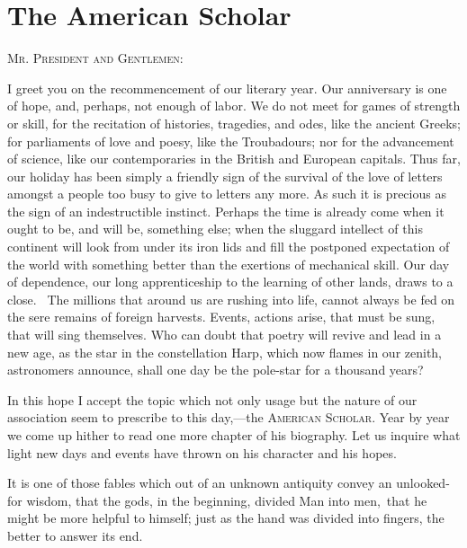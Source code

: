 
\author{Ralph Waldo Emerson}
\chapter{The American Scholar}


\begin{abstract}{c} An Oration delivered before the Phi Beta Kappa
Society, at Cambridge, August 31, 1837. \end{abstract}

\noindent\textsc{Mr. President and Gentlemen}:

I greet you on the recommencement of our literary year. Our
anniversary is one of hope, and, perhaps, not enough of labor. We do
not meet for games of strength or skill, for the recitation of
histories, tragedies, and odes, like the ancient Greeks; for
parliaments of love and poesy, like the Troubadours; nor for the
advancement of science, like our contemporaries in the British and
European capitals. Thus far, our holiday has been simply a friendly
sign of the survival of the love of letters amongst a people too busy
to give to letters any more. As such it is precious as the sign of an
indestructible instinct. Perhaps the time is already come when it
ought to be, and will be, something else; when the sluggard intellect
of this continent will look from under its iron lids and fill the
postponed expectation of the world with something better than the
exertions of mechanical skill. Our day of dependence, our long
apprenticeship to the learning of other lands, draws to a close. 
 The millions that around us are rushing into life, cannot
always be fed on the sere remains of foreign harvests. Events, actions
arise, that must be sung, that will sing themselves. Who can doubt
that poetry will revive and lead in a new age, as the star in the
constellation Harp, which now flames in our zenith, astronomers
announce, shall one day be the pole-star for a thousand years?

In this hope I accept the topic which not only usage but the nature of
our association seem to prescribe to this day,---the \textsc{American
Scholar}. Year by year we come up hither to read one more chapter of
his biography. Let us inquire what light new days and events have
thrown on his character and his hopes.

It is one of those fables which out of an unknown antiquity convey an
unlooked-for wisdom, that the gods, in the beginning, divided Man into
men, that he might be more helpful to himself; just as the hand was
divided into fingers, the better to answer its end.

